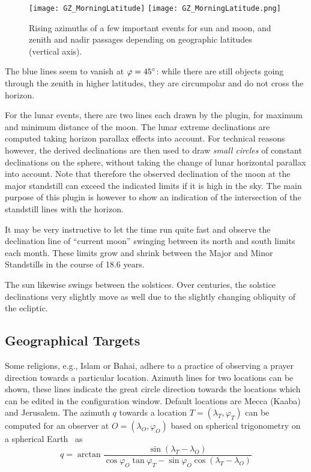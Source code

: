 \begin{figure}[t]
\ifpdf
\texttt{[image: GZ\_MorningLatitude]}
\else
\texttt{[image: GZ\_MorningLatitude.png]}
\fi
\caption{Rising azimuths of a few important events for sun and moon,
  and zenith and nadir passages depending on geographic latitudes
  (vertical axis).}
\label{fig:plugin:ArchaeoLines:MorningLatitudes}
\end{figure}

The blue lines seem to vanish at $\varphi=45\degree$: while there are
still objects going through the zenith in higher latitudes, they are
circumpolar and do not cross the horizon.

For the lunar events, there are two lines each drawn by the plugin,
for maximum and minimum distance of the moon.  The lunar extreme
declinations are computed taking horizon parallax effects into
account. For technical reasons however, the derived declinations are
then used to draw \emph{small circles} of constant declinations on the
sphere, without taking the change of lunar horizontal parallax into
account.  Note that therefore the observed declination of the moon at
the major standstill can exceed the indicated limits if it is high in
the sky. The main purpose of this plugin is however to show an
indication of the intersection of the standstill lines with the
horizon.

It may be very instructive to let the time run quite fast and observe
the declination line of ``current moon'' swinging between its north
and south limits each month.  These limits grow and shrink between the
Major and Minor Standstills in the course of 18.6 years.

The sun likewise swings between the solstices. Over centuries, the
solstice declinations very slightly move as well due to the slightly
changing obliquity of the ecliptic.

\subsection{Geographical Targets}
\label{sec:plugin:ArchaeoLines:GeographicalTargets}

Some religions, e.g., Islam or Bahai, adhere to a practice of
observing a prayer direction towards a particular location.  Azimuth
lines for two locations can be shown, these lines indicate the great
circle direction towards the locations which can be edited in the
configuration window. Default locations are Mecca (Kaaba) and
Jerusalem.  The azimuth $q$ towards a location $T=(\lambda_T,
\varphi_T)$ can be computed for an observer at $O=(\lambda_O, \varphi_O)$
based on spherical trigonometry on a spherical
Earth~\citep{Abdali:1997} as
\begin{equation}
  \label{eq:qibla}
  q=\arctan \frac{\sin (\lambda_{T} - \lambda_O) } { \cos\varphi_O \tan\varphi_T - \sin\varphi_O \cos(\lambda_{T} - \lambda_O) }
\end{equation}

